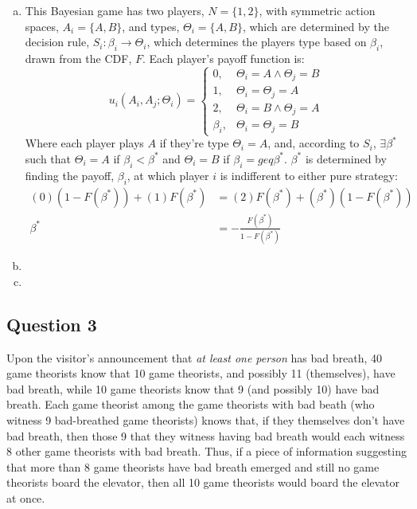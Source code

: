 \documentclass{article}
\begin{document}
\begin{enumerate}[(a)]
	
	\item This Bayesian game has two players, ${N=\{1,2\}}$, with symmetric action spaces, ${A_i=\{A,B\}}$, and types, ${\Theta_i=\{A,B\}}$, which are determined by the decision rule, ${S_i:\beta_i\rightarrow\Theta_i}$, which determines the players type based on $\beta_i$, drawn from the CDF, $F$. Each player's payoff function is:
		\[
			u_i(A_i,A_j;\Theta_i) = 	\begin{cases}
										0, 			& \Theta_i = A\land \Theta_j = B	\\
										1, 			& \Theta_i = \Theta_j = A 			\\
										2, 			& \Theta_i = B\land \Theta_j = A	\\
										\beta_i, 	& \Theta_i = \Theta_j = B
									\end{cases}
		\]
		Where each player plays $A$ if they're type $\Theta_i=A$, and, according to $S_i$, $\exists\beta^*$ such that ${\Theta_i=A}$ if ${\beta_i<\beta^*}$ and ${\Theta_i=B}$ if ${\beta_i=geq\beta^*}$. $\beta^*$ is determined by finding the payoff, $\beta_i$, at which player $i$ is indifferent to either pure strategy:
			\begin{align*}
				(0)(1-F(\beta^*)) + (1)F(\beta^*) &= (2)F(\beta^*) + (\beta^*)(1-F(\beta^*))	\\
					\beta^* &= -\frac{F(\beta^*)}{1-F(\beta^*)}
			\end{align*}
	
	
	\item 
	
	
	\item 
	
	
\end{enumerate}


\subsection*{Question 3}
Upon the visitor's announcement that \textit{at least one person} has bad breath, 40 game theorists know that 10 game theorists, and possibly 11 (themselves), have bad breath, while 10 game theorists know that 9 (and possibly 10) have bad breath. Each game theorist among the game theorists with bad beath (who witness 9 bad-breathed game theorists) knows that, if they themselves don't have bad breath, then those 9 that they witness having bad breath would each witness 8 other game theorists with bad breath. Thus, if a piece of information suggesting that more than 8 game theorists have bad breath emerged and still no game theorists board the elevator, then all 10 game theorists would board the elevator at once.
\end{document}
